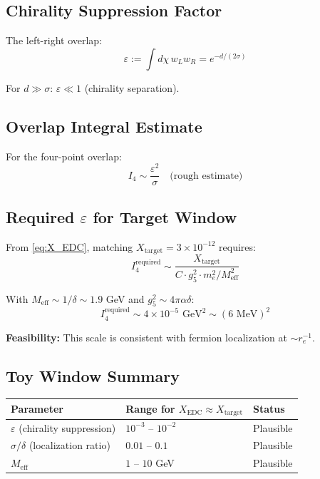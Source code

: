 \documentclass[11pt]{article}
\begin{document}
\subsection{Chirality Suppression Factor}

The left-right overlap:
\begin{equation}
    \varepsilon := \int d\chi \, w_L w_R = e^{-d/(2\sigma)}
\end{equation}

For $d \gg \sigma$: $\varepsilon \ll 1$ (chirality separation).

\subsection{Overlap Integral Estimate}

For the four-point overlap:
\begin{equation}
    I_4 \sim \frac{\varepsilon^2}{\sigma} \quad \text{(rough estimate)}
\end{equation}

\subsection{Required $\varepsilon$ for Target Window}

From \eqref{eq:X_EDC}, matching $X_{\text{target}} = 3 \times 10^{-12}$ requires:
\begin{equation}
    I_4^{\text{required}} \sim \frac{X_{\text{target}}}{C \cdot g_5^2 \cdot m_e^2 / M_{\text{eff}}^2}
\end{equation}

With $M_{\text{eff}} \sim 1/\delta \sim 1.9$ GeV and $g_5^2 \sim 4\pi\alpha\delta$:
\begin{equation}
    I_4^{\text{required}} \sim 4 \times 10^{-5} \text{ GeV}^2 \sim (6 \text{ MeV})^2
\end{equation}

\textbf{Feasibility:} This scale is consistent with fermion localization at $\sim r_e^{-1}$.

\subsection{Toy Window Summary}

\begin{center}
\begin{tabular}{lll}
\toprule
\textbf{Parameter} & \textbf{Range for $X_{\text{EDC}} \approx X_{\text{target}}$} & \textbf{Status} \\
\midrule
$\varepsilon$ (chirality suppression) & $10^{-3}$ -- $10^{-2}$ & Plausible \\
$\sigma/\delta$ (localization ratio) & $0.01$ -- $0.1$ & Plausible \\
$M_{\text{eff}}$ & $1$ -- $10$ GeV & Plausible \\
\bottomrule
\end{tabular}
\end{center}
\end{document}
